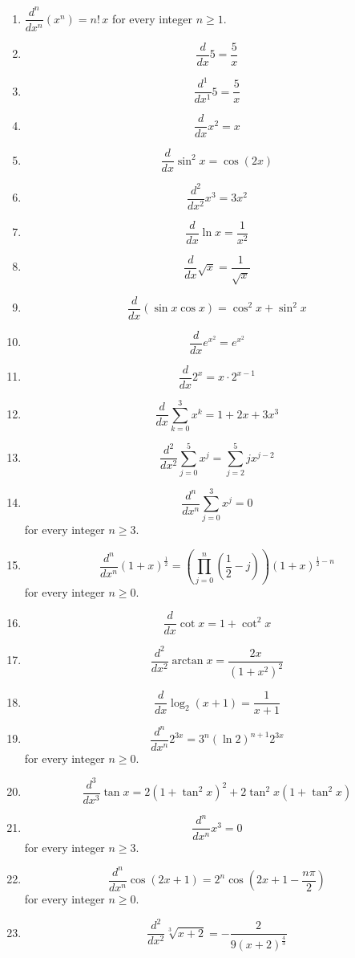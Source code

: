 \documentclass[11pt,a4paper]{article}
\begin{document}
\begin{enumerate}
\item $\dfrac{d^n}{dx^n}\left(x^{n}\right)=n!\,x$ for every integer $n\ge1$.
\item \[ \frac{d}{dx} 5 = \frac{5}{x} \]
\item \[ \frac{d^{1}}{dx^{1}} 5 = \frac{5}{x} \]
\item \[ \frac{d}{dx} x^{2} = x \]
\item \[ \frac{d}{dx} \sin^{2} x = \cos\left(2x\right) \]
\item \[ \frac{d^{2}}{dx^{2}} x^{3} = 3x^{2} \]
\item \[ \frac{d}{dx} \ln x = \frac{1}{x^{2}} \]
\item \[ \frac{d}{dx} \sqrt{x} = \frac{1}{\sqrt{x}} \]
\item \[ \frac{d}{dx} \left(\sin x \cos x\right) = \cos^{2} x + \sin^{2} x \]
\item \[ \frac{d}{dx} e^{x^{2}} = e^{x^{2}} \]
\item \[ \frac{d}{dx} 2^{x} = x \cdot 2^{x - 1} \]
\item \[ \frac{d}{dx} \sum_{k=0}^{3} x^{k} = 1 + 2x + 3x^{3} \]
\item \[ \frac{d^{2}}{dx^{2}} \sum_{j=0}^{5} x^{j} = \sum_{j=2}^{5} j x^{j-2} \]
\item \[ \frac{d^{n}}{dx^{n}} \sum_{j=0}^{3} x^{j} = 0 \] for every integer $n \ge 3$.
\item \[ \frac{d^{n}}{dx^{n}} \left(1+x\right)^{\frac{1}{2}} = \left(\prod_{j=0}^{n} \left(\frac{1}{2} - j\right)\right) \left(1+x\right)^{\frac{1}{2} - n} \] for every integer $n \ge 0$.
\item \[ \frac{d}{dx} \cot x = 1 + \cot^{2} x \]
\item \[ \frac{d^{2}}{dx^{2}} \arctan x = \frac{2x}{\left(1+x^{2}\right)^{2}} \]
\item \[ \frac{d}{dx} \log_{2}\left(x+1\right) = \frac{1}{x+1} \]
\item \[ \frac{d^{n}}{dx^{n}} 2^{3x} = 3^{n} \left(\ln 2\right)^{n+1} 2^{3x} \] for every integer $n \ge 0$.
\item \[ \frac{d^{3}}{dx^{3}} \tan x = 2\left(1+\tan^{2} x\right)^{2} + 2\tan^{2} x \left(1+\tan^{2} x\right) \]
\item \[ \frac{d^{n}}{dx^{n}} x^{3} = 0 \] for every integer $n \ge 3$.
\item \[ \frac{d^{n}}{dx^{n}} \cos\left(2x+1\right) = 2^{n} \cos\left(2x + 1 - \frac{n\pi}{2}\right) \] for every integer $n \ge 0$.
\item \[ \frac{d^{2}}{dx^{2}} \sqrt[3]{x+2} = -\frac{2}{9 \left(x+2\right)^{\frac{4}{3}}} \]

\end{enumerate}
\end{document}
